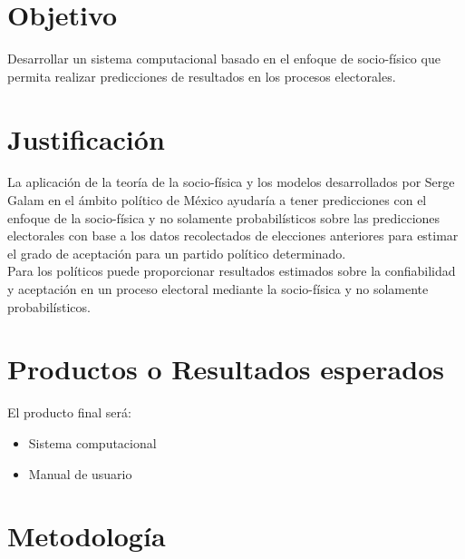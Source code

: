 \documentclass[letterpaper, 10pt]{article}
\begin{document}
\section{Objetivo}
Desarrollar un sistema computacional basado en el enfoque de socio-físico que permita realizar predicciones de resultados en los procesos electorales. 

\section{Justificación}

La aplicación de la teoría de la socio-física y los modelos desarrollados por Serge Galam en el ámbito político de México ayudaría a tener predicciones con el enfoque de la socio-física y no solamente probabilísticos sobre las predicciones electorales con base a los datos recolectados de elecciones anteriores para estimar el grado de aceptación para un partido político determinado.
\\
\vspace{5mm} %
Para los políticos puede proporcionar resultados estimados sobre la confiabilidad y aceptación en un proceso electoral mediante la socio-física y no solamente probabilísticos.

\section{Productos o Resultados esperados}
El producto final será:
\begin{itemize}
    \item Sistema computacional
    \item Manual de usuario
\end{itemize}

\section{Metodología}
\end{document}
